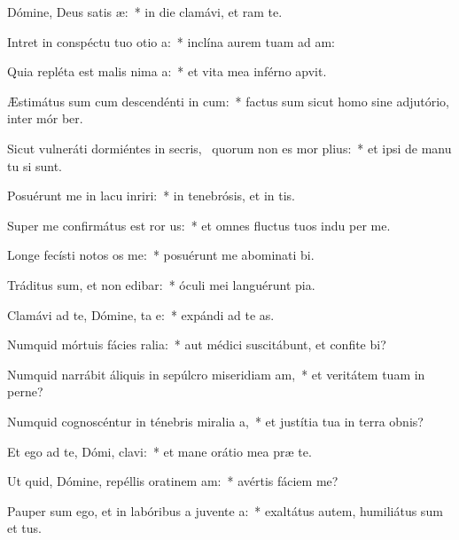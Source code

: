 \item Dómine, Deus satis æ:~* in die clamávi, et  ram te.
\item Intret in conspéctu tuo otio a:~* inclína aurem tuam ad  am:
\item Quia repléta est malis nima a:~* et vita mea inférno apvit.
\item Æstimátus sum cum descendénti in cum:~* factus sum sicut homo sine adjutório, inter mór ber.
\item Sicut vulneráti dormiéntes in secris,~\pscross{} quorum non es mor plius:~* et ipsi de manu tu si sunt.
\item Posuérunt me in lacu inriri:~* in tenebrósis, et in  tis.
\item Super me confirmátus est ror us:~* et omnes fluctus tuos indu per me.
\item Longe fecísti notos os  me:~* posuérunt me abominati bi.
\item Tráditus sum, et non edibar:~* óculi mei languérunt  pia.
\item Clamávi ad te, Dómine, ta e:~* expándi ad te  as.
\item Numquid mórtuis fácies ralia:~* aut médici suscitábunt, et confite bi?
\item Numquid narrábit áliquis in sepúlcro miseridiam am,~* et veritátem tuam in perne?
\item Numquid cognoscéntur in ténebris miralia a,~* et justítia tua in terra obnis?
\item Et ego ad te, Dómi, clavi:~* et mane orátio mea præ te.
\item Ut quid, Dómine, repéllis oratinem am:~* avértis fáciem   me?
\item Pauper sum ego, et in labóribus a juvente a:~* exaltátus autem, humiliátus sum et tus.
